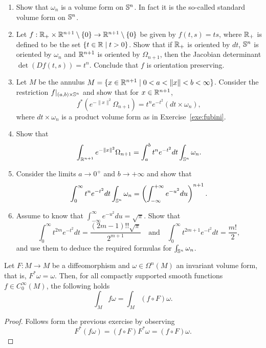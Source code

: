 \begin{exercise}
  \begin{enumerate}
    \item Show that $\omega_n$ is a volume form on $\mathbb{S}^n$. In fact it is the so-called standard volume form on $\mathbb{S}^n$.
    \item Let $f:\mathbb{R}_+\times\mathbb{R}^{n+1}\setminus\{0\}\to \mathbb{R}^{n+1}\setminus\{0\}$ be given by $f(t,s) = ts$, where $\mathbb{R}_+$ is defined to be the set $\{t\in\mathbb{R} \mid t >0\}$.
    Show that if $\mathbb{R}_+$ is oriented by $dt$, $\mathbb{S}^n$ is oriented by $\omega_n$ and $\mathbb{R}^{n+1}$ is oriented by $\Omega_{n+1}$, then the Jacobian determinant $\det(Df(t,s))= t^n$.
    Conclude that $f$ is orientation preserving.
    \item Let $M$ be the annulus $M = \{x\in\mathbb{R}^{n+1} \mid 0<a<\|x\|<b<\infty\}$. Consider the restriction $f|_{(a,b)\times \mathbb{S}^n}$ and show that for $x\in\mathbb{R}^{n+1}$,
    \begin{equation}
      f^*\left(e^{-\|x\|^2}\Omega_{n+1}\right) = t^n e^{-t^2}(dt \times \omega_n),
    \end{equation}
    where $dt\times\omega_n$ is a product volume form as in Exercise~\ref{exe:fubini}.
    \item Show that
    \begin{equation}
      \int_{\mathbb{R}^{n+1}}e^{-\|x\|^2}\Omega_{n+1} = \int_a^b t^ne^{-t^2} dt \int_{\mathbb{S}^n}\omega_n.
    \end{equation}
    \item Consider the limits $a\to0^+$ and $b\to+\infty$ and show that
    \begin{equation}
      \int_0^\infty t^n e^{-t^2} dt \int_{\mathbb{S}^n}\omega_n = \left(\int_{-\infty}^{+\infty} e^{-u^2} du\right)^{n+1}.
    \end{equation}
    \item Assume to know that $\int_{-\infty}^{\infty} e^{-u^2}du = \sqrt{\pi}$. Show that
    \begin{equation}
      \int_0^\infty t^{2m} e^{-t^2}dt = \frac{(2m-1)!!\sqrt{\pi}}{2^{m+1}}
      \quad\mbox{and}\quad
      \int_0^\infty t^{2m+1} e^{-t^2}dt = \frac{m!}{2},
    \end{equation}
    and use them to deduce the required formulas for $\int_{\mathbb{S}^n}\omega_n$.
  \end{enumerate}
\end{exercise}

\begin{corollary}
  Let $F:M\to M$ be a diffeomorphism and $\omega\in\Omega^n(M)$ an invariant volume form, that is, $F^*\omega =\omega$.
  Then, for all compactly supported smooth functions $f\in C^\infty_0(M)$, the following holds
  \begin{equation}
    \int_M f\omega = \int_M (f\circ F)\omega.
  \end{equation}
\end{corollary}
\begin{proof}
  Follows form the previous exercise by observing
  \begin{equation}
    F^*(f\omega) = (f\circ F) F^*\omega = (f\circ F)\omega.
  \end{equation}
\end{proof}

